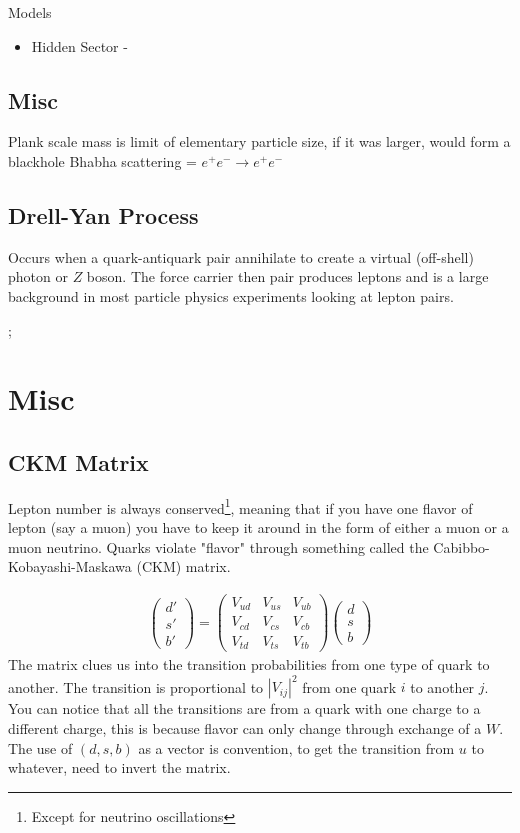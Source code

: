 Models
\begin{itemize}
    \item Hidden Sector - 
\end{itemize}


\subsection{Misc}

Plank scale mass is limit of elementary particle size, if it was larger, would form a blackhole
Bhabha scattering = $e^+e^-\rightarrow e^+e^-$

\subsection{Drell-Yan Process}
Occurs when a quark-antiquark pair annihilate to create a virtual (off-shell) photon or $Z$ boson. The force carrier then pair produces leptons and is a large background in most particle physics experiments looking at lepton pairs.


\centerline{
;
}
\section{Misc}

\subsection{CKM Matrix}
Lepton number is always conserved\footnote{Except for neutrino oscillations}, meaning that if you have one flavor of lepton (say a muon) you have to keep it around in the form of either a muon or a muon neutrino. Quarks violate "flavor" through something called the Cabibbo-Kobayashi-Maskawa (CKM) matrix.

\begin{align}
\begin{pmatrix}
d'\\
s'\\
b'
\end{pmatrix} = \begin{pmatrix}
V_{ud}&V_{us}&V_{ub}\\
V_{cd}&V_{cs}&V_{cb}\\
V_{td}&V_{ts}&V_{tb}
\end{pmatrix} \begin{pmatrix}
d\\
s\\
b
\end{pmatrix}
\end{align}
The matrix clues us into the transition probabilities from one type of quark to another. The transition is proportional to $|V_{ij}|^2$ from one quark $i$ to another $j$. You can notice that all the transitions are from a quark with one charge to a different charge, this is because flavor can only change through exchange of a $W$. The use of $(d,s,b)$ as a vector is convention, to get the transition from $u$ to whatever, need to invert the matrix.

